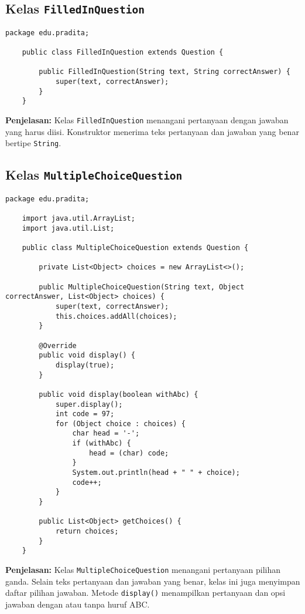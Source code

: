 \subsection{Kelas \texttt{FilledInQuestion}}

\begin{lstlisting}[style=JavaStyle]
	package edu.pradita;
	
	public class FilledInQuestion extends Question {
		
		public FilledInQuestion(String text, String correctAnswer) {
			super(text, correctAnswer);
		}
	}
\end{lstlisting}

\textbf{Penjelasan:} Kelas \texttt{FilledInQuestion} menangani pertanyaan dengan jawaban yang harus diisi. Konstruktor menerima teks pertanyaan dan jawaban yang benar bertipe \texttt{String}.

\subsection{Kelas \texttt{MultipleChoiceQuestion}}

\begin{lstlisting}[style=JavaStyle]
	package edu.pradita;
	
	import java.util.ArrayList;
	import java.util.List;
	
	public class MultipleChoiceQuestion extends Question {
		
		private List<Object> choices = new ArrayList<>();
		
		public MultipleChoiceQuestion(String text, Object correctAnswer, List<Object> choices) {
			super(text, correctAnswer);
			this.choices.addAll(choices);
		}
		
		@Override
		public void display() {
			display(true);
		}
		
		public void display(boolean withAbc) {
			super.display();
			int code = 97;
			for (Object choice : choices) {
				char head = '-';
				if (withAbc) {
					head = (char) code;
				}
				System.out.println(head + " " + choice);
				code++;
			}
		}
		
		public List<Object> getChoices() {
			return choices;
		}
	}
\end{lstlisting}

\textbf{Penjelasan:} Kelas \texttt{MultipleChoiceQuestion} menangani pertanyaan pilihan ganda. Selain teks pertanyaan dan jawaban yang benar, kelas ini juga menyimpan daftar pilihan jawaban. Metode \texttt{display()} menampilkan pertanyaan dan opsi jawaban dengan atau tanpa huruf ABC.

